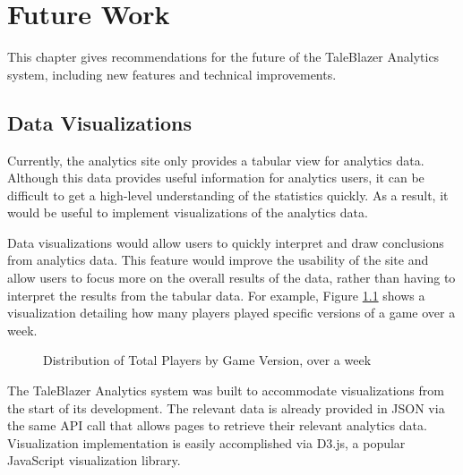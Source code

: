 \chapter{Future Work}

This chapter gives recommendations for the future of the TaleBlazer Analytics system, including new features and technical improvements. 

\section{Data Visualizations}

Currently, the analytics site only provides a tabular view for analytics data. Although this data provides useful information for analytics users, it can be difficult to get a high-level understanding of the statistics quickly. As a result, it would be useful to implement visualizations of the analytics data. 

Data visualizations would allow users to quickly interpret and draw conclusions from analytics data. This feature would improve the usability of the site and allow users to focus more on the overall results of the data, rather than having to interpret the results from the tabular data. For example, Figure \ref{fig:num_completed_viz} shows a visualization detailing how many players played specific versions of a game over a week. 

\begin{figure}[htb]
	\caption[Example Data Visualization]{\label{fig:num_completed_viz} Distribution of Total Players by Game Version, over a week}
\end{figure}

The TaleBlazer Analytics system was built to accommodate visualizations from the start of its development. The relevant data is already provided in JSON via the same API call that allows pages to retrieve their relevant analytics data. Visualization implementation is easily accomplished via D3.js, a popular JavaScript visualization library.

